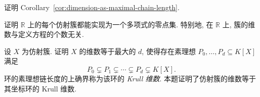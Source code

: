 \begin{BookExercises}
  \item\label{ex:prove-dimension-as-maximal-chain-length} 证明 Corollary~\ref{cor:dimension-as-maximal-chain-length}.
  \item\label{ex:real-affine-variety-defined-by-one-equation} 证明 $\mathbb{R}$ 上的每个仿射簇都能实现为一个多项式的零点集. 特别地, 在 $\mathbb{R}$ 上, 簇的维数与定义方程的个数无关.
  \item\label{ex:krull-dimension-of-coordinate-ring} 设 $X$ 为仿射簇. 证明 $X$ 的维数等于最大的 $d$, 使得存在素理想 $P_{0},\ldots,P_{d}\subseteq K[X]$ 满足
  \[
    P_{0}\subsetneq P_{1}\subsetneq\cdots\subsetneq P_{d}\subsetneq K[X].
  \]
  环的素理想链长度的上确界称为该环的 \emph{Krull 维数}. 本题证明了仿射簇的维数等于其坐标环的 Krull 维数.
\end{BookExercises}
